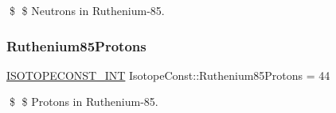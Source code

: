 \$ \$ Neutrons in Ruthenium-\/85. \mbox{\label{group___isotope_const-_ruthenium-_ru85_ga303f831c5155b52399f6de76ec26a04a}} 
\subsubsection{\texorpdfstring{Ruthenium85\+Protons}{Ruthenium85Protons}}
{\footnotesize\ttfamily \mbox{\hyperlink{group___isotope_const-_macros_ga5f18360b3e99483a35c32d789e62621c}{I\+S\+O\+T\+O\+P\+E\+C\+O\+N\+S\+T\+\_\+\+I\+NT}} Isotope\+Const\+::\+Ruthenium85\+Protons = 44}

\$ \$ Protons in Ruthenium-\/85. 